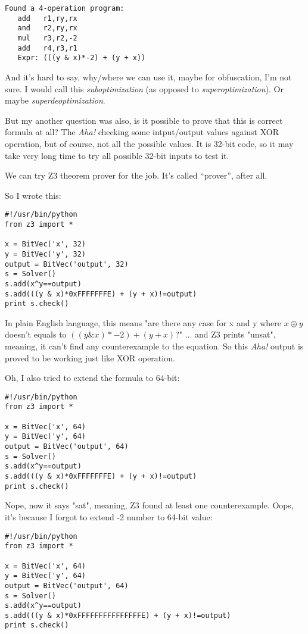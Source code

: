 \begin{lstlisting}
Found a 4-operation program:
   add   r1,ry,rx
   and   r2,ry,rx
   mul   r3,r2,-2
   add   r4,r3,r1
   Expr: (((y & x)*-2) + (y + x))
\end{lstlisting}

And it's hard to say, why/where we can use it, maybe for obfuscation, I'm not sure.
I would call this \textit{suboptimization} (as opposed to \textit{superoptimization}). Or maybe \textit{superdeoptimization}.

But my another question was also, is it possible to prove that this is correct formula at all?
The \textit{Aha!} checking some intput/output values against XOR operation, but of course, not all the possible values.
It is 32-bit code, so it may take very long time to try all possible 32-bit inputs to test it.

We can try Z3 theorem prover for the job. It's called ``prover'', after all.

So I wrote this:

\begin{lstlisting}
#!/usr/bin/python
from z3 import *

x = BitVec('x', 32)
y = BitVec('y', 32)
output = BitVec('output', 32)
s = Solver()
s.add(x^y==output)
s.add(((y & x)*0xFFFFFFFE) + (y + x)!=output)
print s.check()
\end{lstlisting}

In plain English language, this means "are there any case for x and y where $x \oplus y$ doesn't equals to $((y \& x)*-2) + (y + x)$?"
... and Z3 prints "unsat", meaning, it can't find any counterexample to the equation.
So this \textit{Aha!} output is proved to be working just like XOR operation.

Oh, I also tried to extend the formula to 64-bit:

\begin{lstlisting}
#!/usr/bin/python
from z3 import *

x = BitVec('x', 64)
y = BitVec('y', 64)
output = BitVec('output', 64)
s = Solver()
s.add(x^y==output)
s.add(((y & x)*0xFFFFFFFE) + (y + x)!=output)
print s.check()
\end{lstlisting}

Nope, now it says "sat", meaning, Z3 found at least one counterexample.
Oops, it's because I forgot to extend -2 number to 64-bit value:

\begin{lstlisting}
#!/usr/bin/python
from z3 import *

x = BitVec('x', 64)
y = BitVec('y', 64)
output = BitVec('output', 64)
s = Solver()
s.add(x^y==output)
s.add(((y & x)*0xFFFFFFFFFFFFFFFE) + (y + x)!=output)
print s.check()
\end{lstlisting}

